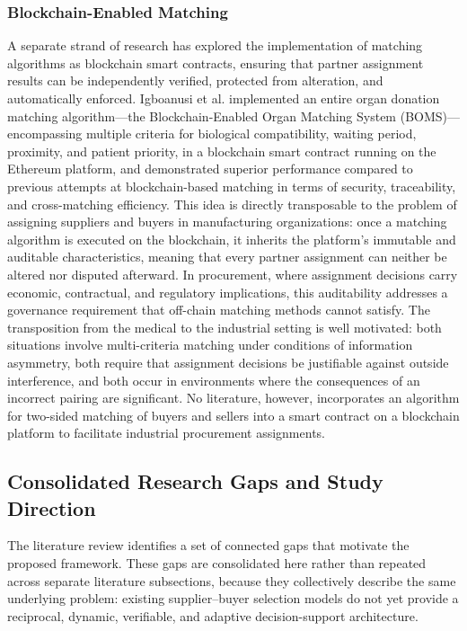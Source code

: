 \documentclass[11pt]{article}
\begin{document}
\subsubsection{Blockchain-Enabled Matching}

A separate strand of research has explored the implementation of matching algorithms as blockchain smart contracts, ensuring that partner assignment results can be independently verified, protected from alteration, and automatically enforced. Igboanusi et al. \cite{ref64} implemented an entire organ donation matching algorithm—the Blockchain-Enabled Organ Matching System (BOMS)—encompassing multiple criteria for biological compatibility, waiting period, proximity, and patient priority, in a blockchain smart contract running on the Ethereum platform, and demonstrated superior performance compared to previous attempts at blockchain-based matching in terms of security, traceability, and cross-matching efficiency. This idea is directly transposable to the problem of assigning suppliers and buyers in manufacturing organizations: once a matching algorithm is executed on the blockchain, it inherits the platform's immutable and auditable characteristics, meaning that every partner assignment can neither be altered nor disputed afterward. In procurement, where assignment decisions carry economic, contractual, and regulatory implications, this auditability addresses a governance requirement that off-chain matching methods cannot satisfy. The transposition from the medical to the industrial setting is well motivated: both situations involve multi-criteria matching under conditions of information asymmetry, both require that assignment decisions be justifiable against outside interference, and both occur in environments where the consequences of an incorrect pairing are significant. No literature, however, incorporates an algorithm for two-sided matching of buyers and sellers into a smart contract on a blockchain platform to facilitate industrial procurement assignments.


\subsection{Consolidated Research Gaps and Study Direction}

The literature review identifies a set of connected gaps that motivate the proposed framework. These gaps are consolidated here rather than repeated across separate literature subsections, because they collectively describe the same underlying problem: existing supplier--buyer selection models do not yet provide a reciprocal, dynamic, verifiable, and adaptive decision-support architecture.
\end{document}
